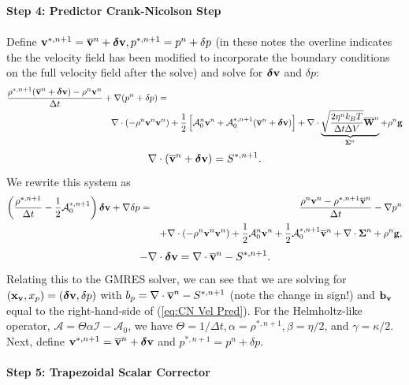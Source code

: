 \documentclass[final]{siamltex}
\def\bb {{\bf b}}
\def\gb {{\bf g}}
\def\vb {{\bf v}}
\def\Wb {{\bf W}}
\def\xb {{\bf x}}
\def\deltab {\boldsymbol{\delta}}
\def\Sigmab {\boldsymbol{\Sigma}}
\def\half   {\frac{1}{2}}
\begin{document}
{\bf Step 4: Predictor Crank-Nicolson Step}\\ \\
Define $\vb^{*,n+1} = \overline\vb^n + \deltab\vb, p^{*,n+1} = p^n + \delta p$ (in these notes the overline
indicates the the velocity field has been modified to incorporate the boundary conditions on the
full velocity field after the solve) and solve
for $\deltab\vb$ and $\delta p$:
\begin{eqnarray}
\frac{\rho^{*,n+1}(\overline\vb^n + \deltab\vb) - \rho^n\vb^n}{\Delta t} + \nabla(p^n+\delta p) &=&\nonumber\\
&&\hspace{-1in}\nabla\cdot(-\rho^n\vb^n\vb^n) + \half\left[\mathcal{A}_0^n\vb^n + \mathcal{A}_0^{*,n+1}(\overline\vb^n + \deltab\vb)\right] + \nabla\cdot\underbrace{\sqrt{\frac{2\eta^n k_B T}{\Delta t\Delta V}}\overline\Wb^n}_{\Sigmab^n} + \rho^n\gb\nonumber\\
\end{eqnarray}
\begin{equation}
\nabla\cdot(\overline\vb^n+\deltab\vb) = S^{*,n+1}.
\end{equation}
We rewrite this system as
\begin{eqnarray}
\left(\frac{\rho^{*,n+1}}{\Delta t} - \half\mathcal{A}_0^{*,n+1}\right)\deltab\vb + \nabla\delta p &=& \frac{\rho^n\vb^n-\rho^{*,n+1}\overline\vb^n}{\Delta t} -\nabla p^n\nonumber\\
&&+ \nabla\cdot(-\rho^n\vb^n\vb^n) + \half\mathcal{A}_0^n\vb^n + \half\mathcal{A}_0^{*,n+1}\overline\vb^n + \nabla\cdot\Sigmab^n + \rho^n\gb,\nonumber\\
\label{eq:CN Vel Pred}
\end{eqnarray}
\begin{equation}
-\nabla\cdot\deltab\vb = \nabla\cdot\overline\vb^n - S^{*,n+1}.
\end{equation}
Relating this to the GMRES solver, we can see that we are solving for 
$(\xb_\vb,x_p) = (\deltab\vb,\delta p)$ with $b_p = \nabla\cdot\overline\vb^n-S^{*,n+1}$ (note the change in sign!) 
and $\bb_\vb$ equal to the right-hand-side of (\ref{eq:CN Vel Pred}).  For the Helmholtz-like operator, 
$\mathcal{A}=\Theta\alpha\mathcal{I} - \mathcal{A}_0$, we have $\Theta=1/\Delta t, \alpha=\rho^{*,n+1}, 
\beta=\eta/2$, and $\gamma=\kappa/2$.
Next, define $\vb^{*,n+1} = \overline\vb^n + \deltab\vb$ and $p^{*,n+1} = p^n + \delta p$.\\ \\
{\bf Step 5: Trapezoidal Scalar Corrector}\\ \\
\end{document}
